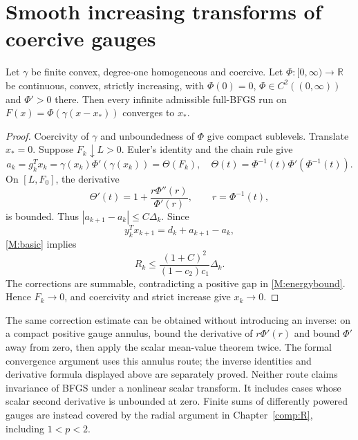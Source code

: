 

\section{Smooth increasing transforms of coercive gauges}
\begin{theorem}\label{F:transform}
Let $\gamma$ be finite convex, degree-one homogeneous and coercive. Let $\Phi:[0,\infty)\to\mathbb R$ be continuous, convex, strictly increasing, with $\Phi(0)=0$, $\Phi\in C^2((0,\infty))$ and $\Phi'>0$ there. Then every infinite admissible full-BFGS run on $F(x)=\Phi(\gamma(x-x_*))$ converges to $x_*$.
\end{theorem}
\begin{proof}
Coercivity of $\gamma$ and unboundedness of $\Phi$ give compact sublevels. Translate $x_*=0$. Suppose $F_k\downarrow L>0$. Euler's identity and the chain rule give
\[
 a_k=g_k^Tx_k=\gamma(x_k)\Phi'(\gamma(x_k))=\Theta(F_k),
\quad\Theta(t)=\Phi^{-1}(t)\Phi'(\Phi^{-1}(t)).
\]
On $[L,F_0]$, the derivative
\[
 \Theta'(t)=1+\frac{r\Phi''(r)}{\Phi'(r)},\qquad r=\Phi^{-1}(t),
\]
is bounded. Thus $|a_{k+1}-a_k|\le C\Delta_k$. Since
\[
 y_k^Tx_{k+1}=d_k+a_{k+1}-a_k,
\]
\eqref{M:basic} implies
\[
 R_k\le\frac{(1+C)^2}{(1-c_2)c_1}\Delta_k.
\]
The corrections are summable, contradicting a positive gap in \eqref{M:energybound}. Hence $F_k\to0$, and coercivity and strict increase give $x_k\to0$.
\end{proof}
The same correction estimate can be obtained without introducing an inverse: on a compact positive gauge annulus, bound the derivative of $r\Phi'(r)$ and bound $\Phi'$ away from zero, then apply the scalar mean-value theorem twice. The formal convergence argument uses this annulus route; the inverse identities and derivative formula displayed above are separately proved. Neither route claims invariance of BFGS under a nonlinear scalar transform. It includes cases whose scalar second derivative is unbounded at zero. Finite sums of differently powered gauges are instead covered by the radial argument in Chapter~\ref{comp:R}, including $1<p<2$.



